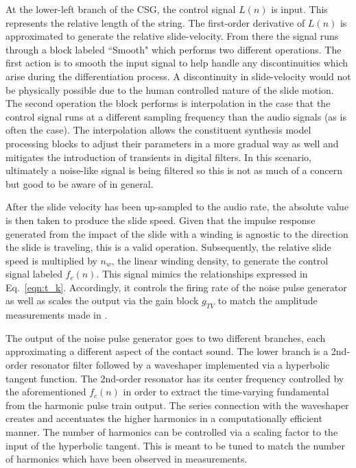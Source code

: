 \documentclass[main.tex]{subfiles}
\begin{document}
At the lower-left branch of the CSG, the control signal $L(n)$ is input. This represents the relative length of the string. The first-order derivative of $L(n)$ is approximated to generate the relative slide-velocity. From there the signal runs through a block labeled ``Smooth" which performs two different operations. The first action is to smooth the input signal to help handle any discontinuities which arise during the differentiation process. A discontinuity in slide-velocity would not be physically possible due to the human controlled nature of the slide motion. The second operation the block performs is interpolation in the case that the control signal runs at a different sampling frequency than the audio signals (as is often the case). The interpolation allows the constituent synthesis model processing blocks to adjust their parameters in a more gradual way as well and mitigates the introduction of transients in digital filters. In this scenario, ultimately a noise-like signal is being filtered so this is not as much of a concern but good to be aware of in general.

After the slide velocity has been up-sampled to the audio rate, the absolute value is then taken to produce the slide speed. Given that the impulse response generated from the impact of the slide with a winding is agnostic to the direction the slide is traveling, this is a valid operation. Subsequently, the relative slide speed is multiplied by $n_w$, the linear winding density, to generate the control signal labeled $f_c(n)$. This signal mimics the relationships expressed in Eq.~\ref{eqn:t_k}. Accordingly, it controls the firing rate of the noise pulse generator as well as scales the output via the gain block $g_{TV}$ to match the amplitude measurements made in .

The output of the noise pulse generator goes to two different branches, each approximating a different aspect of the contact sound. The lower branch is a 2nd-order resonator filter followed by a waveshaper implemented via a hyperbolic tangent function. The 2nd-order resonator has its center frequency controlled by the aforementioned $f_c(n)$ in order to extract the time-varying fundamental from the harmonic pulse train output. The series connection with the waveshaper creates and accentuates the higher harmonics in a computationally efficient manner. The number of harmonics can be controlled via a scaling factor to the input of the hyperbolic tangent. This is meant to be tuned to match the number of harmonics which have been observed in measurements.
\end{document}
